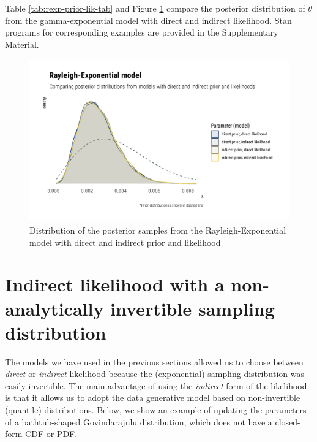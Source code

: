 \documentclass[
  12pt,
]{article}
\begin{document}
Table \ref{tab:rexp-prior-lik-tab} and Figure \ref{fig:rexp-prior-lik-graphs} compare the posterior distribution of \(\theta\) from the gamma-exponential model with direct and indirect likelihood. Stan programs for corresponding examples are provided in the Supplementary Material.

\begin{figure}

{\centering \includegraphics[width=0.8\linewidth]{ilbm_article_files/figure-latex/rexp-prior-lik-graphs-1} 

}

\caption{Distribution of the posterior samples from the Rayleigh-Exponential model with direct and indirect prior and likelihood}\label{fig:rexp-prior-lik-graphs}
\end{figure}

\hypertarget{indirect-likelihood-with-a-non-analytically-invertible-sampling-distribution}{%
\section{Indirect likelihood with a non-analytically invertible sampling distribution}\label{indirect-likelihood-with-a-non-analytically-invertible-sampling-distribution}}

The models we have used in the previous sections allowed us to choose between \emph{direct} or \emph{indirect} likelihood because the (exponential) sampling distribution was easily invertible. The main advantage of using the \emph{indirect} form of the likelihood is that it allows us to adopt the data generative model based on non-invertible (quantile) distributions. Below, we show an example of updating the parameters of a bathtub-shaped Govindarajulu distribution, which does not have a closed-form CDF or PDF.
\end{document}
